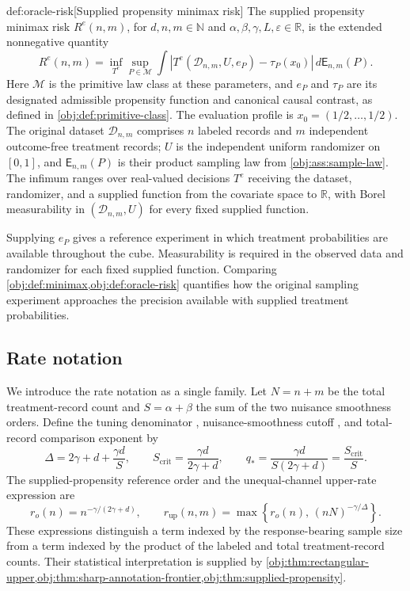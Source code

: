 \begin{definitionv}{def:oracle-risk}[Supplied propensity minimax risk]
The supplied propensity minimax risk \(R^e(n,m)\), for \(d,n,m\in\mathbb N\) and \(\alpha,\beta,\gamma,L,\varepsilon\in\mathbb R\), is the extended nonnegative quantity
\[
R^e(n,m)=\inf_{T^e}\sup_{P\in\mathcal M}
\int
\left|T^e(\mathcal D_{n,m},U,e_P)-\tau_P(x_0)\right|
\,d\mathsf E_{n,m}(P).
\]
Here \(\mathcal M\) is the primitive law class at these parameters, and \(e_P\) and \(\tau_P\) are its designated admissible propensity function and canonical causal contrast, as defined in \cref{obj:def:primitive-class}. The evaluation profile is \(x_0=(1/2,\ldots,1/2)\). The original dataset \(\mathcal D_{n,m}\) comprises \(n\) labeled records and \(m\) independent outcome-free treatment records; \(U\) is the independent uniform randomizer on \([0,1]\), and \(\mathsf E_{n,m}(P)\) is their product sampling law from \cref{obj:ass:sample-law}. The infimum ranges over real-valued decisions \(T^e\) receiving the dataset, randomizer, and a supplied function from the covariate space to \(\mathbb R\), with Borel measurability in \((\mathcal D_{n,m},U)\) for every fixed supplied function.
\end{definitionv}

Supplying \(e_P\) gives a reference experiment in which treatment probabilities are available throughout the cube. Measurability is required in the observed data and randomizer for each fixed supplied function. Comparing \cref{obj:def:minimax,obj:def:oracle-risk} quantifies how the original sampling experiment approaches the precision available with supplied treatment probabilities.

\subsection{Rate notation}

We introduce the rate notation as a single family. Let \(N=n+m\) be the total treatment-record count and \(S=\alpha+\beta\) the sum of the two nuisance smoothness orders. Define the tuning denominator , nuisance-smoothness cutoff , and total-record comparison exponent  by
\[
\Delta=2\gamma+d+\frac{\gamma d}{S},
\qquad
S_{\mathrm{crit}}=\frac{\gamma d}{2\gamma+d},
\qquad
q_*=\frac{\gamma d}{S(2\gamma+d)}
=\frac{S_{\mathrm{crit}}}{S}.
\]
The supplied-propensity reference order  and the unequal-channel upper-rate expression  are
\[
r_o(n)=n^{-\gamma/(2\gamma+d)},
\qquad
r_{\mathrm{up}}(n,m)
=
\max\left\{
r_o(n),\,
(nN)^{-\gamma/\Delta}
\right\}.
\]
These expressions distinguish a term indexed by the response-bearing sample size from a term indexed by the product of the labeled and total treatment-record counts. Their statistical interpretation is supplied by \cref{obj:thm:rectangular-upper,obj:thm:sharp-annotation-frontier,obj:thm:supplied-propensity}.

